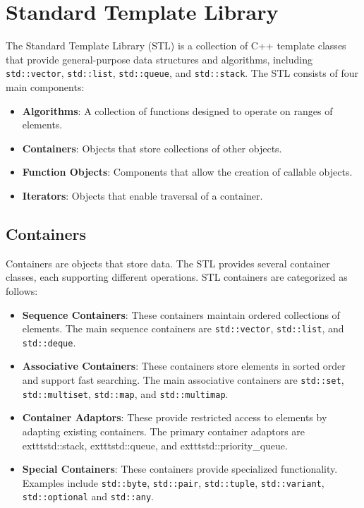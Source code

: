 \chapter{Standard Template Library}

The Standard Template Library (STL) is a collection of C++ template classes that provide general-purpose data structures and algorithms, including \texttt{std::vector}, \texttt{std::list}, \texttt{std::queue}, and \texttt{std::stack}. The STL consists of four main components:

\begin{itemize}
    \item \textbf{Algorithms}: A collection of functions designed to operate on ranges of elements.
    \item \textbf{Containers}: Objects that store collections of other objects.
    \item \textbf{Function Objects}: Components that allow the creation of callable objects.
    \item \textbf{Iterators}: Objects that enable traversal of a container.
\end{itemize}

\section{Containers}

Containers are objects that store data. The STL provides several container classes, each supporting different operations. STL containers are categorized as follows:

\begin{itemize}
    \item \textbf{Sequence Containers}: These containers maintain ordered collections of elements. The main sequence containers are \texttt{std::vector}, \texttt{std::list}, and \texttt{std::deque}.
    \item \textbf{Associative Containers}: These containers store elements in sorted order and support fast searching. The main associative containers are \texttt{std::set}, \texttt{std::multiset}, \texttt{std::map}, and \texttt{std::multimap}.
    \item \textbf{Container Adaptors}: These provide restricted access to elements by adapting existing containers. The primary container adaptors are 	exttt{std::stack}, 	exttt{std::queue}, and 	exttt{std::priority\_queue}.
    \item \textbf{Special Containers}: These containers provide specialized functionality. Examples include \texttt{std::byte}, \texttt{std::pair}, \texttt{std::tuple}, \texttt{std::variant}, \texttt{std::optional} and \texttt{std::any}.
\end{itemize}

